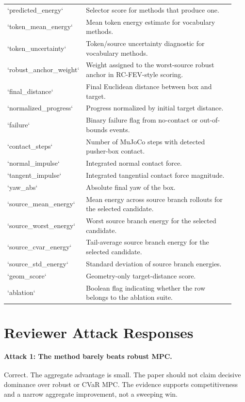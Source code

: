 \documentclass{article}
\newcommand{\method}{RC-FEV}
\begin{document}
\begin{longtable}{p{0.25\linewidth}p{0.68\linewidth}}
`predicted\_energy` & Selector score for methods that produce one. \\
`token\_mean\_energy` & Mean token energy estimate for vocabulary methods. \\
`token\_uncertainty` & Token/source uncertainty diagnostic for vocabulary methods. \\
`robust\_anchor\_weight` & Weight assigned to the worst-source robust anchor in \method-style scoring. \\
`final\_distance` & Final Euclidean distance between box and target. \\
`normalized\_progress` & Progress normalized by initial target distance. \\
`failure` & Binary failure flag from no-contact or out-of-bounds events. \\
`contact\_steps` & Number of MuJoCo steps with detected pusher-box contact. \\
`normal\_impulse` & Integrated normal contact force. \\
`tangent\_impulse` & Integrated tangential contact force magnitude. \\
`yaw\_abs` & Absolute final yaw of the box. \\
`source\_mean\_energy` & Mean energy across source branch rollouts for the selected candidate. \\
`source\_worst\_energy` & Worst source branch energy for the selected candidate. \\
`source\_cvar\_energy` & Tail-average source branch energy for the selected candidate. \\
`source\_std\_energy` & Standard deviation of source branch energies. \\
`geom\_score` & Geometry-only target-distance score. \\
`ablation` & Boolean flag indicating whether the row belongs to the ablation suite. \\
\bottomrule
\end{longtable}

\section{Reviewer Attack Responses}

\paragraph{Attack 1: The method barely beats robust MPC.}
Correct. The aggregate advantage is small. The paper should not claim decisive dominance over robust or CVaR MPC. The evidence supports competitiveness and a narrow aggregate improvement, not a sweeping win.
\end{document}
